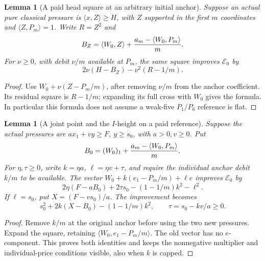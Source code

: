\documentclass[11pt]{article}
\newtheorem{lemma}[theorem]{Lemma}
\theoremstyle{definition}
\theoremstyle{remark}
\newcommand{\ip}[2]{\langle #1,#2\rangle}
\begin{document}
\begin{lemma}[A paid head square at an arbitrary initial anchor]
\label{lem:I-head-paid-square}
Suppose an actual pure classical pressure is
\(\ip xZ\ge H\), with \(Z\) supported in the first \(m\) coordinates
and \(\ip Z{P_m}=1\). Write \(R=Z^2\) and
\[
 B_Z=\ip{W_0}Z+{a_m-\ip{W_0}{P_m}\over m}.
\]
For \(\nu\ge0\), with debit \(\nu/m\) available at \(P_m\), the
same square improves \(\mathcal E_0\) by
\[
 2\nu(H-B_Z)-\nu^2(R-1/m).
\]
\end{lemma}
\begin{proof}
Use \(W_0+\nu(Z-P_m/m)\), after removing \(\nu/m\) from the
anchor coefficient. Its residual square is \(R-1/m\); expanding its
full cross with \(W_0\) gives the formula. In particular this formula
does not assume a weak-five \(P_1/P_6\) reference is flat.
\end{proof}

\begin{lemma}[A joint point and the \(I\)-height on a paid reference]
\label{lem:I-joint-paid-reference}
Suppose the actual pressures are \(a x_1+v y\ge F\), \(y\ge s_0\),
with \(a>0,v\ge0\). Put
\[
 B_0=(W_0)_1+{a_m-\ip{W_0}{P_m}\over m}.
\]
For \(\eta,\tau\ge0\), write \(k=\eta a\), \(\ell=\eta v+\tau\),
and require the individual anchor debit \(k/m\) to be available.
The vector
\(W_0+k(e_1-P_m/m)+\ell e\) improves \(\mathcal E_0\) by
\[
 2\eta(F-aB_0)+2\tau s_0-(1-1/m)k^2-\ell^2.
\]
If \(\ell=s_0\), put \(X=(F-vs_0)/a\). The improvement becomes
\[
 s_0^2+2k(X-B_0)-(1-1/m)k^2,
 \qquad \tau=s_0-kv/a\ge0.
\]
\end{lemma}
\begin{proof}
Remove \(k/m\) at the original anchor before using the two new
pressures. Expand the square, retaining
\(\ip{W_0}{e_1-P_m/m}\). The old vector has no \(e\)-component.
This proves both identities and keeps the nonnegative multiplier and
individual-price conditions visible, also when \(k\) is capped.
\end{proof}
\end{document}

